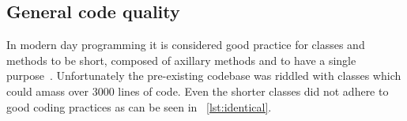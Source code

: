 \subsection{General code quality}
In modern day programming it is considered good practice for classes and methods to be short, composed of axillary methods and to have a single purpose~\cite{so_can_a_function_be_too_short}. Unfortunately the pre-existing codebase was riddled with classes which could amass over 3000 lines of code. Even the shorter classes did not adhere to good coding practices as can be seen in ~\cref{lst:identical}.

